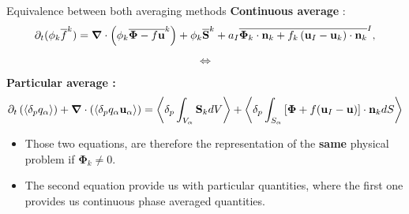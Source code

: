 \documentclass{sintefbeamer}
\newcommand{\nablab}{\bm{\nabla}}
\begin{document}
\begin{frame}{Equivalence between both averaging methods}
  \textbf{Continuous average} :
  \begin{equation*}
      \pddt (\phi_k\kavg{f})
      = \nablab \cdot \left(
          \phi_k \kavg{\bm{\Phi} - f \textbf{u}}
      \right)
      + \phi_k \kavg{\textbf{S}}
      + a_I \Iavg{
          \bm{\Phi}_k \cdot \textbf{n}_k
          + f_k 
          \left(
              \textbf{u}_I
              - \textbf{u}_k
          \right) \cdot \textbf{n}_k
      },
      \label{eq:avg_k_global}
  \end{equation*}

  \begin{center}
    \begin{equation*}
      \Longleftrightarrow 
    \end{equation*}
  \end{center}
  \textbf{Particular average :}
  \begin{equation*}
    \pddt   \left(\pavg{q_\alpha}\right)
    + \nablab \cdot \left(\pavg{q_\alpha \textbf{u}_\alpha}\right) 
    = \pavg{\int_{V_\alpha} \textbf{S}_k dV}
    + \pavg{\int_{S_\alpha} \left[\bm{\Phi} + f (\textbf{u}_I-\textbf{u}) \right] \cdot \textbf{n}_k d S}
    \label{eq:avg_p_global}
\end{equation*}
\begin{itemize}
  \item Those two equations, are therefore the representation of the \textbf{same} physical problem if $\bm{\Phi}_k \neq 0$.
  \item The second equation provide us with particular quantities, where the first one provides us continuous phase averaged quantities. 
\end{itemize}
\end{frame}
\end{document}
